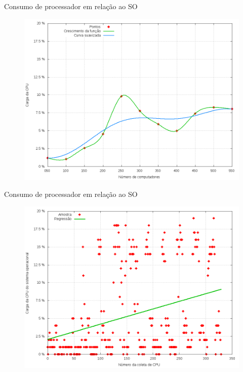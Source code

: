 \begin{frame}{Consumo de processador em relação ao SO}

    \begin{figure}[!htb]
        \centering
        \includegraphics[scale=.35]{images/sys-cpu-growth}
    \end{figure}
\end{frame}



\begin{frame}{Consumo de processador em relação ao SO}

    \begin{figure}[!htb]
        \centering
        \includegraphics[scale=.35]{images/scatter-sys-cpu}
    \end{figure}
\end{frame}


